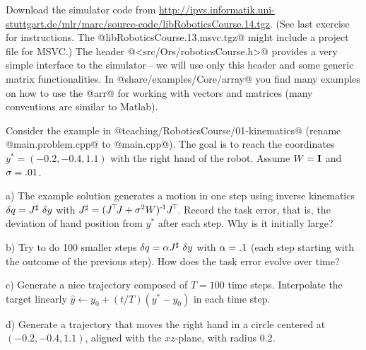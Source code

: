 


Download the simulator code from
{\tiny\url{http://ipvs.informatik.uni-stuttgart.de/mlr/marc/source-code/libRoboticsCourse.14.tgz}}. (See
last exercise for instructions. The @libRoboticsCourse.13.msvc.tgz@
might include a project file for MSVC.)  The header
@<src/Ors/roboticsCourse.h>@ provides a very simple interface to the
simulator---we will use only this header and some generic matrix
functionalities. In @share/examples/Core/array@ you find many examples
on how to use the @arr@ for working with vectors and matrices (many
conventions are similar to Matlab).

Consider the example in @teaching/RoboticsCourse/01-kinematics@
(rename @main.problem.cpp@ to @main.cpp@). The goal is to reach the
coordinates $y^*=(-0.2, -0.4, 1.1)$ with the right hand of the
robot. Assume $W={\rm\bf I}$ and $\sigma=.01$.

a) The example solution generates a motion in one step using inverse
kinematics $\delta q = J^\sharp~ \delta y$ with $J^\sharp = (J^{\!\top\!} J + \sigma^2
W)^{{\hspace*{-.0pt}\text{\rm -}\hspace*{-.5pt}}1} J^{\!\top\!}$. Record the task error, that is, the deviation of hand
position from $y^*$ after each step. Why is it initially large?

b) Try to do 100 smaller steps $\delta q = \alpha J^\sharp~ \delta y$ with $\alpha=.1$
(each step starting with the outcome of the previous step). How does
the task error evolve over time?

c) Generate a nice trajectory composed of $T=100$ time
steps. Interpolate the target linearly $\hat y \gets y_0 + (t/T)(y^*-y_0)$ in
each time step.

d) Generate a trajectory that moves the right hand in a circle centered at
$(-0.2, -0.4, 1.1)$, aligned with the $xz$-plane, with radius $0.2$.


\exerfoot
